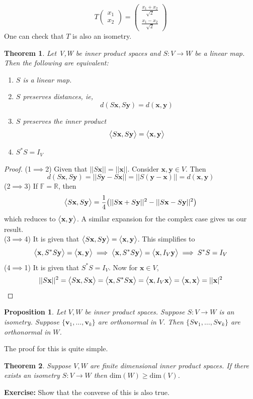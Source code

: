 \documentclass{article}
\newtheorem{theorem}{Theorem}
\newtheorem{proposition}{Proposition}
\begin{document}
 $$
T
\begin{pmatrix}
    x_1\\
    x_2
\end{pmatrix}
=
\begin{pmatrix}
    \frac{x_1 +x_2}{\sqrt{2}}\\
    \frac{x_1-x_2}{\sqrt{2}}
\end{pmatrix}
 $$
 One can check that $T$ is also an isometry. 
 \\
\begin{theorem}
    Let V,W be inner product spaces and $S:V\to W$ be a linear map. Then the following are equivalent:
    \begin{enumerate}
        \item $S$ is a linear map.
        \item $S$ preserves distances, ie, $$d(S\mathbf{x},S\mathbf{y})=d(\mathbf{x},\mathbf{y})$$
        \item $S$ preserves the inner product 
         $$\big{<}S\mathbf{x},S\mathbf{y}\big{>}=\big{<}\mathbf{x},\mathbf{y}\big{>}$$
        \item $S^{*}S=I_{V}$
        \end{enumerate}
\end{theorem}
\begin{proof}
  (1$\implies$2) Given that $||S\mathbf{x}||=||\mathbf{x}||$. Consider $\mathbf{x},\mathbf{y}\in V$. Then 
  $$d(S\mathbf{x},S\mathbf{y})=||S\mathbf{y}-S\mathbf{x}||=||S(\mathbf{y}-\mathbf{x})||=d(\mathbf{x},\mathbf{y})$$  
(2$\implies$3) If $\mathbb{F}=\mathbb{R}$, then
$$\big{<}S\mathbf{x},S\mathbf{y}\big{>}=\frac{1}{4}\big{(}||S\mathbf{x}+S\mathbf{y}||^2 -||S\mathbf{x}-S\mathbf{y}||^2\big{)}$$
which reduces to $\big{<}\mathbf{x},\mathbf{y}\big{>}$.
A similar expansion for the complex case gives us our result.\\
(3$\implies$4) It is given that $\big{<}S\mathbf{x},S\mathbf{y}\big{>}=\big{<}\mathbf{x},\mathbf{y}\big{>}$. This simplifies to
$$\big{<}\mathbf{x},S^{*}S\mathbf{y}\big{>}=\big{<}\mathbf{x},\mathbf{y}\big{>}\implies \big{<}\mathbf{x},S^{*}S\mathbf{y}\big{>}=\big{<}\mathbf{x},I_{V}\mathbf{y}\big{>}\implies S^{*}S=I_V$$
(4$\implies$1) It is given that $S^{*}S=I_V$. Now for $\mathbf{x}\in V$,
$$||S\mathbf{x}||^2=\big{<}S\mathbf{x},S\mathbf{x}\big{>}=\big{<}\mathbf{x},S^{*}S\mathbf{x}\big{>}=\big{<}\mathbf{x},I_V \mathbf{x}\big{>}=\big{<}\mathbf{x},\mathbf{x}\big{>}=||\mathbf{x}|^2$$
\end{proof}

\begin{proposition}
    Let $V,W$ be inner product spaces. Suppose $S:V\to W$ is an isometry. Suppose $\{\mathbf{v}_1,\dots,\mathbf{v}_k\}$ are orthonormal in $V$. Then $\{S\mathbf{v}_1,\dots,S\mathbf{v}_k\}$ are orthonormal in $W$.
\end{proposition}
The proof for this is quite simple.
\begin{theorem}
    Suppose $V,W$ are finite dimensional inner product spaces. If there exists an isometry $S:V\to W$ then $\text{dim}(W)\geq \text{dim}(V)$.
\end{theorem}
\textbf{Exercise:} Show that the converse of this is also true.
\end{document}
